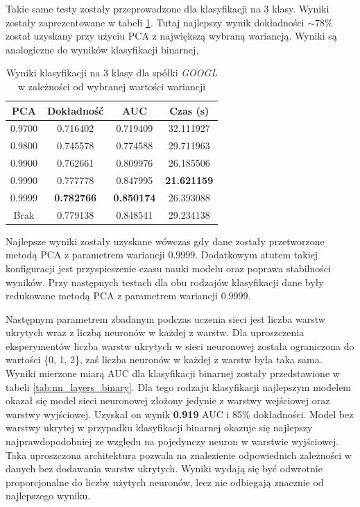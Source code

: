 \documentclass[a4paper, twoside, 11pt, openright]{article}
\begin{document}
Takie same testy zostały przeprowadzone dla klasyfikacji na 3 klasy. Wyniki zostały zaprezentowane w tabeli \ref{tab:nn_pca_discrete}. Tutaj najlepszy wynik dokładności $\sim{78\%}$ został uzyskany przy użyciu PCA z największą wybraną wariancją. Wyniki są analogiczne do wyników klasyfikacji binarnej, 

\begin{table}[H]
    \centering
    \begin{tabular}{|c|c|c|c|}
    \hline
        \textbf{PCA} & \textbf{Dokładność} &  \textbf{AUC} &  \textbf{Czas (s)} \\ \hline
0.9700               &  0.716402 &  0.719409 &   32.111927 \\ \hline
0.9800               &  0.745578 &  0.774588 &   29.711963 \\ \hline
0.9900               &  0.762661 &  0.809976 &   26.185506 \\ \hline
0.9990              &  0.777778 &  0.847995 &   \textbf{21.621159} \\ \hline
0.9999             &  \textbf{0.782766} &  \textbf{0.850174} &   26.393088 \\ \hline
Brak                &  0.779138 &  0.848541 &   29.234138 \\ \hline
    \end{tabular}
    \caption{Wyniki klasyfikacji na 3 klasy dla spółki \textit{GOOGL} w zależności od wybranej wartości wariancji}
    \label{tab:nn_pca_discrete}
\end{table}

Najlepsze wyniki zostały uzyskane wówczas gdy dane zostały przetworzone metodą PCA z parametrem wariancji $0.9999$. Dodatkowym atutem takiej konfiguracji jest przyspieszenie czasu nauki modelu oraz poprawa stabilności wyników.  Przy następnych testach dla obu rodzajów klasyfikacji dane były redukowane metodą PCA z parametrem wariancji $0.9999$.

\bigskip

Następnym parametrem zbadanym podczas uczenia sieci jest liczba warstw ukrytych wraz z liczbą neuronów w każdej z warstw. Dla uproszczenia eksperymentów liczba warstw ukrytych w sieci neuronowej została ograniczona do wartości \{0, 1, 2\}, zaś liczba neuronów w każdej z warstw była taka sama. Wyniki mierzone miarą AUC dla klasyfikacji binarnej zostały przedstawione w tabeli \ref{tab:nn_layers_binary}. Dla tego rodzaju klasyfikacji najlepszym modelem okazał się model sieci neuronowej złożony jedynie z warstwy wejściowej oraz warstwy wyjściowej. Uzyskał on wynik \textbf{0.919} AUC i 85\% dokładności. Model bez warstwy ukrytej w przypadku klasyfikacji binarnej okazuje się najlepszy najprawdopodobniej ze względu na pojedynczy neuron w warstwie wyjściowej. Taka uproszczona architektura pozwala na znalezienie odpowiednich zależności w danych bez dodawania warstw ukrytych. Wyniki wydają się być odwrotnie proporcjonalne do liczby użytych neuronów, lecz nie odbiegają znacznie od najlepszego wyniku.
\end{document}
